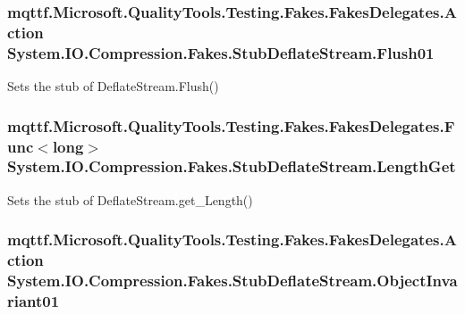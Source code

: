 \hypertarget{class_system_1_1_i_o_1_1_compression_1_1_fakes_1_1_stub_deflate_stream_ae5b0247a5718799c25f69a57be67bce0}{
\subsubsection[{Flush01}]{\setlength{\rightskip}{0pt plus 5cm}mqttf.\-Microsoft.\-Quality\-Tools.\-Testing.\-Fakes.\-Fakes\-Delegates.\-Action System.\-I\-O.\-Compression.\-Fakes.\-Stub\-Deflate\-Stream.\-Flush01}}\label{class_system_1_1_i_o_1_1_compression_1_1_fakes_1_1_stub_deflate_stream_ae5b0247a5718799c25f69a57be67bce0}


Sets the stub of Deflate\-Stream.\-Flush()

\hypertarget{class_system_1_1_i_o_1_1_compression_1_1_fakes_1_1_stub_deflate_stream_a5bb0262d260d8abe3d7e886b3a9f7a46}{
\subsubsection[{Length\-Get}]{\setlength{\rightskip}{0pt plus 5cm}mqttf.\-Microsoft.\-Quality\-Tools.\-Testing.\-Fakes.\-Fakes\-Delegates.\-Func$<$long$>$ System.\-I\-O.\-Compression.\-Fakes.\-Stub\-Deflate\-Stream.\-Length\-Get}}\label{class_system_1_1_i_o_1_1_compression_1_1_fakes_1_1_stub_deflate_stream_a5bb0262d260d8abe3d7e886b3a9f7a46}


Sets the stub of Deflate\-Stream.\-get\-\_\-\-Length()

\hypertarget{class_system_1_1_i_o_1_1_compression_1_1_fakes_1_1_stub_deflate_stream_a5d3af57fb7b24d446ccf965ae604b2d7}{
\subsubsection[{Object\-Invariant01}]{\setlength{\rightskip}{0pt plus 5cm}mqttf.\-Microsoft.\-Quality\-Tools.\-Testing.\-Fakes.\-Fakes\-Delegates.\-Action System.\-I\-O.\-Compression.\-Fakes.\-Stub\-Deflate\-Stream.\-Object\-Invariant01}}\label{class_system_1_1_i_o_1_1_compression_1_1_fakes_1_1_stub_deflate_stream_a5d3af57fb7b24d446ccf965ae604b2d7}


